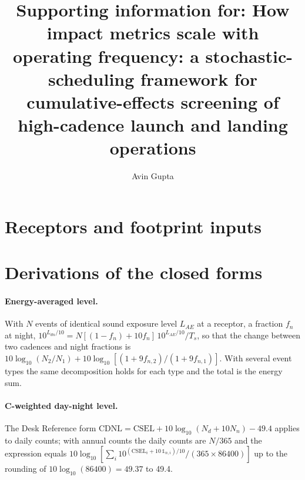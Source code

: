 \documentclass[11pt]{article}
\title{Supporting information for: How impact metrics scale with operating frequency: a stochastic-scheduling framework for cumulative-effects screening of high-cadence launch and landing operations}
\author{Avin Gupta}
\date{}
\begin{document}
\maketitle

\section{Receptors and footprint inputs}

\begin{table}[htbp]
\caption{Receptors used in the analysis (distance and azimuth from the pad reference point). Derivations are given in \texttt{data/processed/receptors.csv}.}
\centering\footnotesize
\tableReceptors
\end{table}

\begin{table}[htbp]
\caption{Per-operation inputs and footprint fits. Digitized contour radii are honored exactly by monotone interpolation; the law parameters $L_0$ and $\alpha$ describe the extrapolation beyond the outermost contour and their residuals against all points are reported in \texttt{footprint\_fit\_residuals.csv}.}
\centering\scriptsize
\tablePerOperation
\end{table}

\section{Derivations of the closed forms}

\paragraph{Energy-averaged level.} With $N$ events of identical sound exposure level $L_{AE}$ at a receptor, a fraction $f_n$ at night, $10^{L_{dn}/10} = N[(1-f_n) + 10 f_n]\,10^{L_{AE}/10}/T_s$, so that the change between two cadences and night fractions is $10\log_{10}(N_2/N_1) + 10\log_{10}[(1+9f_{n,2})/(1+9f_{n,1})]$. With several event types the same decomposition holds for each type and the total is the energy sum.

\paragraph{C-weighted day-night level.} The Desk Reference form $\mathrm{CDNL} = \mathrm{CSEL} + 10\log_{10}(N_d + 10N_n) - 49.4$ applies to daily counts; with annual counts the daily counts are $N/365$ and the expression equals $10\log_{10}[\sum_i 10^{(\mathrm{CSEL}_i + 10\,\mathbb{1}_{n,i})/10}/(365\times 86400)]$ up to the rounding of $10\log_{10}(86400) = 49.37$ to 49.4.
\end{document}
